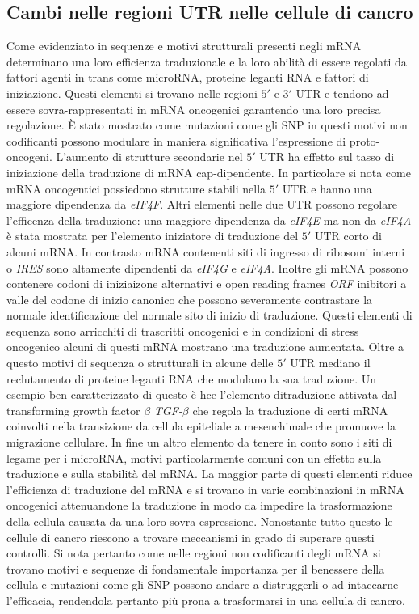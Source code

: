 	\subsection{Cambi nelle regioni UTR nelle cellule di cancro}
	Come evidenziato in \cite{tranconcancer} sequenze e motivi strutturali presenti negli mRNA determinano una loro efficienza traduzionale e la loro abilit\`a di essere regolati da fattori agenti in trans come microRNA, proteine leganti RNA e fattori di iniziazione.
	Questi elementi si trovano nelle regioni $5'$ e $3'$ UTR e tendono ad essere sovra-rappresentati in mRNA oncogenici garantendo una loro precisa regolazione.
	\`E stato mostrato come mutazioni come gli SNP in questi motivi non codificanti possono modulare in maniera significativa l'espressione di proto-oncogeni.
	L'aumento di strutture secondarie nel $5'$ UTR ha effetto sul tasso di iniziazione della traduzione di mRNA cap-dipendente.
	In particolare si nota come mRNA oncogentici possiedono strutture stabili nella $5'$ UTR e hanno una maggiore dipendenza da \emph{eIF4F}.
	Altri elementi nelle due UTR possono regolare l'efficenza della traduzione: una maggiore dipendenza da \emph{eIF4E} ma non da \emph{eIF4A} \`e stata mostrata per l'elemento iniziatore di traduzione del $5'$ UTR corto di alcuni mRNA.
	In contrasto mRNA contenenti siti di ingresso di ribosomi interni o \emph{IRES} sono altamente dipendenti da \emph{eIF4G} e \emph{eIF4A}.
	Inoltre gli mRNA possono contenere codoni di iniziaizone alternativi e open reading frames \emph{ORF} inibitori a valle del codone di inizio canonico che possono severamente contrastare la normale identificazione del normale sito di inizio di traduzione.
	Questi elementi di sequenza sono arricchiti di trascritti oncogenici e in condizioni di stress oncogenico alcuni di questi mRNA mostrano una traduzione aumentata.
	Oltre a questo motivi di sequenza o strutturali in alcune delle $5'$ UTR mediano il reclutamento di proteine leganti RNA che modulano la sua traduzione.
	Un esempio ben caratterizzato di questo \`e hce l'elemento ditraduzione attivata dal transforming growth factor $\beta$ \emph{TGF-$\beta$} che regola la traduzione di certi mRNA coinvolti nella transizione da cellula epiteliale a mesenchimale che promuove la migrazione cellulare.
	In fine un altro elemento da tenere in conto sono i siti di legame per i microRNA, motivi particolarmente comuni con un effetto sulla traduzione e sulla stabilit\`a del mRNA.
	La maggior parte di questi elementi riduce l'efficienza di traduzione del mRNA e si trovano in varie combinazioni in mRNA oncogenici attenuandone la traduzione in modo da impedire la trasformazione della cellula causata da una loro sovra-espressione.
	Nonostante tutto questo le cellule di cancro riescono a trovare meccanismi in grado di superare questi controlli.
	Si nota pertanto come nelle regioni non codificanti degli mRNA si trovano motivi e sequenze di fondamentale importanza per il benessere della cellula e mutazioni come gli SNP possono andare a distruggerli o ad intaccarne l'efficacia, rendendola pertanto pi\`u prona a trasformarsi in una cellula di cancro.

